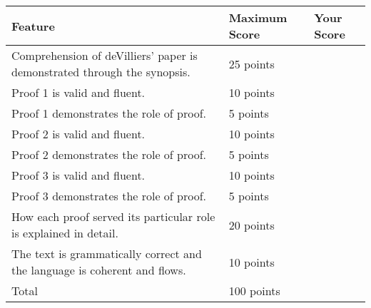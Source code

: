 \documentclass[12pt]{article}
\begin{document}
\begin{tabular}{|p{4in}|p{1.25in}||p{1.25in}|}
\hline
Feature & Maximum Score & Your Score \\
\hline
Comprehension of deVilliers' paper is demonstrated through the synopsis. & 25 points & \vspace{30pt} \\
\hline
Proof 1 is valid and fluent.  & 10 points &\vspace{30pt} \\
\hline
Proof 1 demonstrates the role of proof. & 5 points &\vspace{30pt} \\
\hline
Proof 2 is valid and fluent. & 10 points &\vspace{30pt} \\
\hline
Proof 2 demonstrates the role of proof. & 5 points &\vspace{30pt} \\
\hline
Proof 3 is valid and fluent. & 10 points &\vspace{30pt} \\
\hline
Proof 3 demonstrates the role of proof. & 5 points &\vspace{30pt} \\
\hline
How each proof served its particular role is explained in detail. & 20 points &\vspace{30pt} \\
\hline
The text is grammatically correct and the language is coherent and flows. & 10 points &\vspace{30pt} \\
\hline

Total  & 100 points & \vspace{30pt}\\ 
\hline
\end{tabular}
\end{document}
